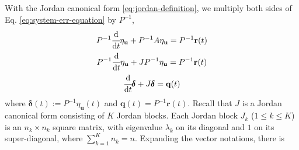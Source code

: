 \documentclass[accepted]{uai2023}
\newcommand{\vect}[1]{\mathbf{#1}}
\newcommand{\dt}[1]{\cfrac{\mathrm{d} #1}{\mathrm{d} t}}
\newcommand{\Err}{\eta}
\begin{document}
    With the Jordan canonical form \ref{eq:jordan-definition}, we multiply both sides of Eq. \ref{eq:system-err-equation} by $P^{-1}$,
    \begin{gather}
        P^{-1}\dt{}\Err_{\vect{u}} + P^{-1}A \Err_{\vect{u}} = P^{-1}\vect{r}(t) \\
        P^{-1}\dt{}\Err_{\vect{u}} + JP^{-1} \Err_{\vect{u}} = P^{-1}\vect{r}(t) \\
        \dt{}\pmb{\delta} + J \pmb{\delta}  = \vect{q}(t) 
    \end{gather}
    where $\pmb{\delta}(t) := P^{-1}\Err_\vect{u}(t)$ and $\vect{q}(t) = P^{-1}\vect{r}(t)$. Recall that $J$ is a Jordan canonical form consisting of $K$ Jordan blocks. Each Jordan block $J_k$ ($1\leq k \leq K$) is an $n_k \times n_k$ square matrix, with eigenvalue $\lambda_k$ on its diagonal and $1$ on its super-diagonal, where $\sum_{k=1}^{K} n_k = n$. Expanding the vector notations, there is 
    \begingroup
        \newcommand{\?}[1]{\multicolumn{1}{c|}{#1}}
\end{document}
